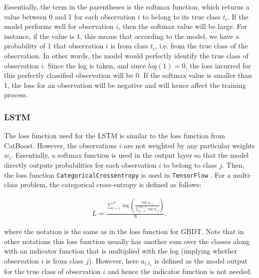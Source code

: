 \documentclass{article}
\begin{document}
	Essentially, the term in the parentheses is the softmax function, which returns a value between 0 and 1 for each observation $i$ to belong to its true class $t_i$. If the model performs well for observation $i$, then the softmax value will be large. For instance, if the value is 1, this means that according to the model, we have a probability of 1 that observation $i$ is from class $t_i$, i.e. from the true class of the observation. In other words, the model would perfectly identify the true class of observation $i$. Since the log is taken, and since $log(1)=0$, the loss incurred for this perfectly classified observation will be 0. If the softmax value is smaller than 1, the loss for an observation will be negative and will hence affect the training process.
		
	\subsubsection{LSTM}
	
	The loss function used for the LSTM is similar to the loss function from CatBoost. However, the observations $i$ are not weighted by any particular weights $w_i$. Essentially, a softmax function is used in the output layer so that the model directly outputs probabilities for each observation $i$ to belong to class $j$. Then, the loss function \lstinline{CategoricalCrossentropy} is used in \lstinline{TensorFlow} \cite{noauthor_module:_nodate}. For a multi-class problem, the categorical cross-entropy is defined as follows:
	
	\begin{align}
	L = \frac{\sum_{i = 1}^N \log \left(\frac{\exp a_{i, t_i}}{\sum_{j = 0}^{M-1} \exp a_{i, j}}\right)}{N}, 
	\end{align}
	
	where the notation is the same as in the loss function for GBDT. Note that in other notations this loss function usually has another sum over the classes along with an indicator function that is multiplied with the log (implying whether observation $i$ is from class $j$). However, here $a_{i, t_i}$ is defined as the model output for the true class of observation $i$ and hence the indicator function is not needed.
	

	

	
	
\end{document}
